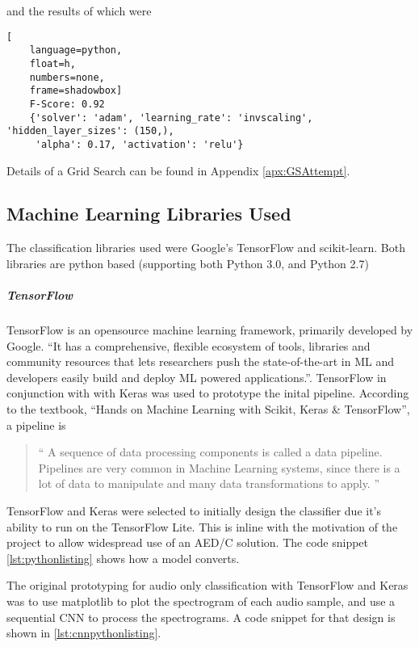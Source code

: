 \documentclass{UoNMCHA}
\newcommand{\inlineQuote}[1]{``#1''}
\newcommand{\fancyquote}[1]{\begin{quotation}\inlineQuote{#1}\end{quotation}}
\numberwithin{equation}{section}
\begin{document}
and the results of which were

\begin{lstlisting}[
    language=python,
    float=h,
    numbers=none,
    frame=shadowbox]
    F-Score: 0.92
    {'solver': 'adam', 'learning_rate': 'invscaling', 'hidden_layer_sizes': (150,),
     'alpha': 0.17, 'activation': 'relu'}
\end{lstlisting}

Details of a Grid Search can be found in Appendix \ref{apx:GSAttempt}.


\subsection{Machine Learning Libraries Used}

The classification libraries used were Google's TensorFlow and scikit-learn. Both libraries are python based (supporting both Python 3.0, and Python 2.7) \cite{scikitlearnpythonVer} \cite{TFpythonVer}%

\subparagraph{TensorFlow}
TensorFlow is an opensource machine learning framework, primarily developed by Google.
\inlineQuote{It has a comprehensive, flexible ecosystem of tools, libraries and community resources that lets researchers push the state-of-the-art in ML and developers easily build and deploy ML powered applications.}\cite{TFwebsite}. TensorFlow in conjunction with with Keras was used to prototype the inital pipeline. According to the textbook, \inlineQuote{Hands on Machine Learning with Scikit, Keras \& TensorFlow}, a pipeline is 
\fancyquote{
A sequence of data processing components is called a data pipeline. Pipelines are very common in Machine Learning systems, since there is a lot of data to manipulate and many data transformations to apply\cite{HandsOnMLTextbook}.
}

TensorFlow and Keras were selected to initially design the classifier due it's ability to run on the TensorFlow Lite. This is inline with the motivation of the project to allow widespread use of an AED/C solution. The code snippet \ref{lst:pythonlisting} shows how a model converts.



The original prototyping for audio only classification with TensorFlow and Keras was to use matplotlib to plot the spectrogram of each audio sample, and use a sequential CNN to process the spectrograms. A code snippet for that design is shown in \ref{lst:cnnpythonlisting}.
\end{document}
